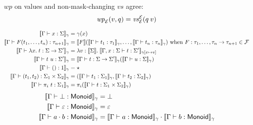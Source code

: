 \begin{lem}
	$\mathit{wp}$ on values and non-mask-changing $\mathit{vs}$ agree:
	\[ \mathit{wp}_{\mathcal{E}}(v, q) = \mathit{vs}_{\mathcal{E}}^{\mathcal{E}}(q \: v)  \]
\end{lem}



\begin{align*}
	\Sem{\vctx \proves x : \sort}_\gamma &= \gamma(x) \\
	\Sem{\vctx \proves \sigfn(\term_1, \dots, \term_n) : \type_{n+1}}_\gamma &= \Sem{\sigfn}(\Sem{\vctx \proves \term_1 : \type_1}_\gamma, \dots, \Sem{\vctx \proves \term_n : \type_n}_\gamma) \ \WHEN \sigfn : \type_1, \dots, \type_n \to \type_{n+1} \in \SigFn \\
	\Sem{\vctx \proves \Lam x. \term : \sort \to \sort'}_\gamma &=
	\Lam v : \Sem{\sort}. \Sem{\vctx, x : \sort \proves \term : \sort'}_{\gamma[x \mapsto v]} \\
	\Sem{\vctx \proves \term~\termB : \sort'}_\gamma &=
	\Sem{\vctx \proves \term : \sort \to \sort'}_\gamma(\Sem{\vctx \proves \termB : \sort}_\gamma) \\
	\Sem{\vctx \proves \unitterm : \unitsort}_\gamma &= \star \\
	\Sem{\vctx \proves (\term_1, \term_2) : \sort_1 \times \sort_2}_\gamma &= (\Sem{\vctx \proves \term_1 : \sort_1}_\gamma, \Sem{\vctx \proves \term_2 : \sort_2}_\gamma) \\
	\Sem{\vctx \proves \pi_i~\term : \sort_1}_\gamma &= \pi_i(\Sem{\vctx \proves \term : \sort_1 \times \sort_2}_\gamma)
\end{align*}
%
\begin{align*}
	\llbracket \Gamma \vdash \bot : \textsf{Monoid} \rrbracket_\gamma &= \bot \\
	\llbracket \Gamma \vdash \mathord{\varepsilon} : \textsf{Monoid} \rrbracket_\gamma &= \mathord{\varepsilon} \\
	\llbracket \Gamma \vdash a \mathbin{\cdot} b : \textsf{Monoid} \rrbracket_\gamma &=
	\llbracket \Gamma \vdash a : \textsf{Monoid} \rrbracket_\gamma \mathbin{\cdot} \llbracket \Gamma \vdash b : \textsf{Monoid} \rrbracket_\gamma
\end{align*}
%

